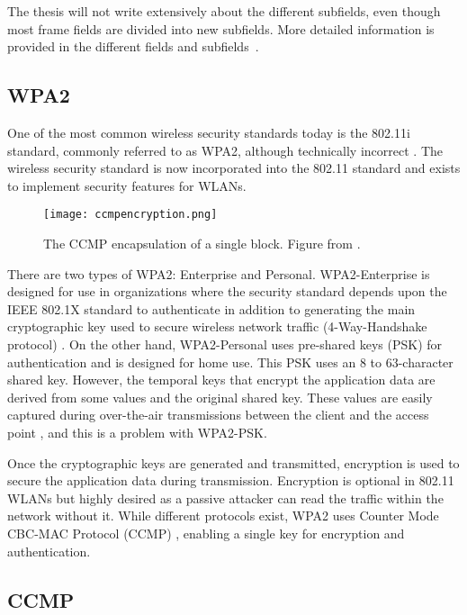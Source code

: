The thesis will not write extensively about the different subfields, even though most frame fields are divided into new subfields. More detailed information is provided in the different fields and subfields~\cite{9363693}.

\subsection{WPA2\label{subsec:wpa-back}}

One of the most common wireless security standards today is the 802.11i standard, commonly referred to as WPA2, although technically incorrect \cite{brzuska2017modular}. The wireless security standard is now incorporated into the 802.11 standard and exists to implement security features for WLANs.

\begin{figure}
\texttt{[image: ccmpencryption.png]}
\caption{The CCMP encapsulation of a single block. Figure from \cite{10.3844/jcssp.2015.283.290}.}
\label{fig:ccmpencryption}
\end{figure}

There are two types of WPA2: Enterprise and Personal. WPA2-Enterprise is designed for use in organizations where the security standard depends upon the IEEE 802.1X standard to authenticate in addition to generating the main cryptographic key used to secure wireless network traffic (4-Way-Handshake protocol) \cite{nakhila2016parallel}. On the other hand, WPA2-Personal uses pre-shared keys (PSK) for authentication and is designed for home use. This PSK uses an 8 to 63-character shared key. However, the temporal keys that encrypt the application data are derived from some values and the original shared key. These values are easily captured during over-the-air transmissions between the client and the access point \cite{9376023}, and this is a problem with WPA2-PSK.

Once the cryptographic keys are generated and transmitted, encryption is used to secure the application data during transmission. Encryption is optional in 802.11 WLANs but highly desired as a passive attacker can read the traffic within the network without it. While different protocols exist, WPA2 uses Counter Mode CBC-MAC Protocol (CCMP) \cite{brzuska2017modular}, enabling a single key for encryption and authentication.

\subsection{CCMP\label{subsec:ccmp-back}}

